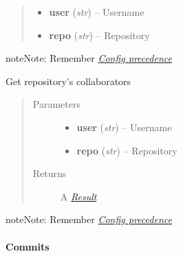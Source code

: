 \documentclass[letterpaper,10pt,english]{sphinxmanual}
\begin{document}
\begin{fulllineitems}
\begin{fulllineitems}
\begin{quote}
\begin{description}
\begin{itemize}
\item {} 
\textbf{user} (\emph{str}) -- Username

\item {} 
\textbf{repo} (\emph{str}) -- Repository

\end{itemize}

\end{description}\end{quote}

\begin{notice}{note}{Note:}
Remember {\hyperref[repos:config-precedence]{\emph{Config precedence}}}
\end{notice}

\end{fulllineitems}


\begin{fulllineitems}
\label{repos:pygithub3.services.repos.Collaborators.list}
Get repository's collaborators
\begin{quote}\begin{description}
\item[{Parameters}] \leavevmode\begin{itemize}
\item {} 
\textbf{user} (\emph{str}) -- Username

\item {} 
\textbf{repo} (\emph{str}) -- Repository

\end{itemize}

\item[{Returns}] \leavevmode
A {\hyperref[result::doc]{\emph{Result}}}

\end{description}\end{quote}

\begin{notice}{note}{Note:}
Remember {\hyperref[repos:config-precedence]{\emph{Config precedence}}}
\end{notice}

\end{fulllineitems}


\end{fulllineitems}



\paragraph{Commits}
\label{repos:commits}\label{repos:commits-service}
\end{document}
